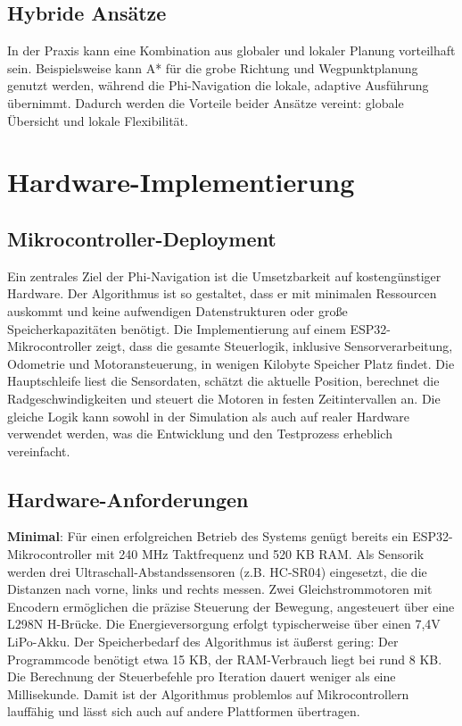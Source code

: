﻿\documentclass[a4paper,12pt]{article}
\theoremstyle{definition}
\begin{document}
\subsection{Hybride Ansätze}

In der Praxis kann eine Kombination aus globaler und lokaler Planung vorteilhaft sein. Beispielsweise kann A* für die grobe Richtung und Wegpunktplanung genutzt werden, während die Phi-Navigation die lokale, adaptive Ausführung übernimmt. Dadurch werden die Vorteile beider Ansätze vereint: globale Übersicht und lokale Flexibilität.

\section{Hardware-Implementierung}

\subsection{Mikrocontroller-Deployment}

Ein zentrales Ziel der Phi-Navigation ist die Umsetzbarkeit auf kostengünstiger Hardware. Der Algorithmus ist so gestaltet, dass er mit minimalen Ressourcen auskommt und keine aufwendigen Datenstrukturen oder große Speicherkapazitäten benötigt. Die Implementierung auf einem ESP32-Mikrocontroller zeigt, dass die gesamte Steuerlogik, inklusive Sensorverarbeitung, Odometrie und Motoransteuerung, in wenigen Kilobyte Speicher Platz findet. Die Hauptschleife liest die Sensordaten, schätzt die aktuelle Position, berechnet die Radgeschwindigkeiten und steuert die Motoren in festen Zeitintervallen an. Die gleiche Logik kann sowohl in der Simulation als auch auf realer Hardware verwendet werden, was die Entwicklung und den Testprozess erheblich vereinfacht.

\subsection{Hardware-Anforderungen}

	\textbf{Minimal}:
Für einen erfolgreichen Betrieb des Systems genügt bereits ein ESP32-Mikrocontroller mit 240 MHz Taktfrequenz und 520 KB RAM. Als Sensorik werden drei Ultraschall-Abstandssensoren (z.B. HC-SR04) eingesetzt, die die Distanzen nach vorne, links und rechts messen. Zwei Gleichstrommotoren mit Encodern ermöglichen die präzise Steuerung der Bewegung, angesteuert über eine L298N H-Brücke. Die Energieversorgung erfolgt typischerweise über einen 7,4V LiPo-Akku. Der Speicherbedarf des Algorithmus ist äußerst gering: Der Programmcode benötigt etwa 15 KB, der RAM-Verbrauch liegt bei rund 8 KB. Die Berechnung der Steuerbefehle pro Iteration dauert weniger als eine Millisekunde. Damit ist der Algorithmus problemlos auf Mikrocontrollern lauffähig und lässt sich auch auf andere Plattformen übertragen.
\end{document}
